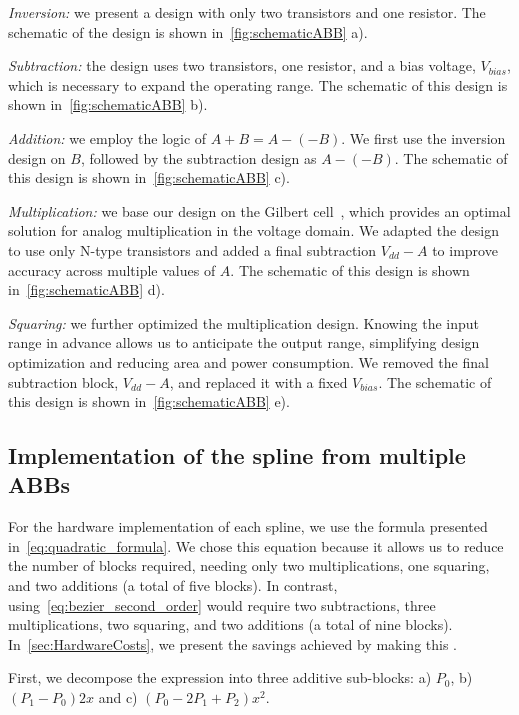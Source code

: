\textit{Inversion:} we present a design with only two transistors and one resistor. 
The schematic of the design is shown in~\autoref{fig:schematicABB} a).

\textit{Subtraction:} the design uses two transistors, one resistor, and a bias voltage, $V_{bias}$, which is necessary to expand the operating range. 
The schematic of this design is shown in~\autoref{fig:schematicABB} b).

\textit{Addition:} we employ the logic of $A+B=A-(-B)$. We first use the inversion design on $B$, followed by the subtraction design as $A-(-B)$. 
The schematic of this design is shown in~\autoref{fig:schematicABB} c).

\textit{Multiplication:} we base our design on the Gilbert cell~\cite{Pawase:GilbertCell2018,DIAZSANCHEZ:AnalogMulti:2021}, which provides an optimal solution for analog multiplication in the voltage domain. 
We adapted the design to use only N-type transistors and added a final subtraction $V_{dd}-A$ to improve accuracy across multiple values of $A$. 
The schematic of this design is shown in~\autoref{fig:schematicABB} d).

\textit{Squaring:} we further optimized the multiplication design. 
Knowing the input range in advance allows us to anticipate the output range, simplifying design optimization and reducing area and power consumption. 
We removed the final subtraction block, $V_{dd}-A$, and replaced it with a fixed $V_{bias}$. The schematic of this design is shown in~\autoref{fig:schematicABB} e).

\subsection{Implementation of the spline from multiple ABBs}



For the hardware implementation of each spline, we use the formula presented in~\autoref{eq:quadratic_formula}. 
We chose this equation because it allows us to reduce the number of blocks required, needing only two multiplications, one squaring, and two additions (a total of five blocks). 
In contrast, using~\autoref{eq:bezier_second_order} would require two subtractions, three multiplications, two squaring, and two additions (a total of nine blocks). 
In~\autoref{sec:HardwareCosts}, we present the savings achieved by making this . 

First, we decompose the expression into three additive sub-blocks: a) $P_{0}$, b) $(P_{1}-P_{0})2x$ and c) $(P_{0}-2P_{1}+P_{2})x^2$.

